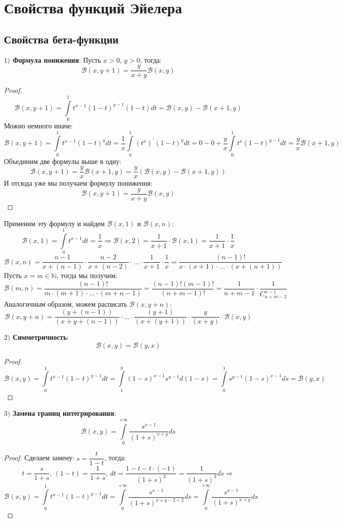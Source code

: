 \documentclass[12pt]{article}
\newcommand{\MN}{\mathbb{N}}
\newcommand{\MB}{\mathcal{B}}
\theoremstyle{definition}
\newcommand{\ddint}[2]{\displaystyle\int\limits_{#1}^{#2}}
\begin{document}
\newpage
\section*{Свойства функций Эйелера}
\subsection*{Свойства бета-функции}

\textbf{$1)$ Формула понижения}: Пусть $x > 0, \, y > 0$, тогда:
$$
	\MB(x, y+1) = \dfrac{y}{x + y}\MB(x,y)
$$
\begin{proof}
	$$
		\MB(x,y+1) = \ddint{0}{1}t^{x-1}(1-t)^{y-1}(1-t)dt= \MB(x,y) - \MB(x+1,y)
	$$
	Можно немного иначе:
	$$
		\MB(x,y+1) = \ddint{0}{1}t^{x-1}(1-t)^{y}dt = \dfrac{1}{x}\ddint{0}{1}\left(t^x\right)^\prime(1-t)^{y}dt = 0 - 0 + \dfrac{y}{x}\ddint{0}{1}t^x(1-t)^{y-1}dt = \dfrac{y}{x}\MB(x+1,y)
	$$
	Объединим две формулы выше в одну:
	$$
		\MB(x, y+1) = \dfrac{y}{x}\MB(x + 1, y) = \dfrac{y}{x}\left(\MB(x,y) - \MB(x + 1, y)\right)
	$$
	И отсюда уже мы получаем формулу понижения:
	$$
		\MB(x, y+1) = \dfrac{y}{x + y}\MB(x,y)
	$$
\end{proof}
Применим эту формулу и найдем $\MB(x,1)$ и $\MB(x,n)$:
$$
	\MB(x,1) = \ddint{0}{1}t^{x-1}dt = \dfrac{1}{x} \Rightarrow \MB(x,2) = \dfrac{1}{x+1}{\cdot}\MB(x,1) = \dfrac{1}{x+1}{\cdot}\dfrac{1}{x}
$$
$$
	\MB(x,n) = \dfrac{n-1}{x + (n-1)}{\cdot}\dfrac{n - 2}{x + (n-2)}{\cdot}\dotsc{\cdot}\dfrac{1}{x+1}{\cdot}\dfrac{1}{x} = \dfrac{(n-1)!}{x{\cdot}(x+1){\cdot}\dotsc{\cdot}(x + (n+1))}
$$
Пусть $x = m \in \MN$, тогда мы получим:
$$
	\MB(m,n) = \dfrac{(n-1)!}{m{\cdot}(m+1){\cdot} \dotsc {\cdot}(m + n -1)} = \dfrac{(n-1)!(m-1)!}{(n + m -1)!}= \dfrac{1}{n + m - 1}{\cdot}\dfrac{1}{C_{n + m - 2}^{n - 1}}
$$
Аналогичным образом, можем расписать $\MB(x,y + n)$:
$$
	\MB(x, y + n) = \dfrac{(y + (n - 1))}{(x + y + (n-1))}{\cdot}\dotsc{\cdot}\dfrac{(y+1)}{(x + (y+1))}{\cdot}\dfrac{y}
	{(x+y)}{\cdot}\MB(x,y)
$$

\textbf{$2)$ Симметричность}: 
$$
	\MB(x,y) = \MB(y,x)
$$
\begin{proof}
	$$
		\MB(x,y) = \ddint{0}{1}t^{x-1}(1 - t)^{y - 1}dt = \ddint{1}{0}(1-s)^{x-1}s^{y-1}d(1-s) = \ddint{0}{1}s^{y-1}(1-s)^{x-1}ds = \MB(y,x)
	$$
\end{proof}
\newpage
\textbf{$3)$ Замена границ интегрирования}: 
$$
	\MB(x,y) =  \ddint{0}{+\infty}\dfrac{s^{x-1}}{(1 + s)^{x+y}}ds
$$
\begin{proof}
	Сделаем замену: $s = \dfrac{t}{1-t}$, тогда:
	$$
		t = \dfrac{s}{1 + s}, \, (1 - t) = \dfrac{1}{1+s}, \, dt = \dfrac{1 - t - t{\cdot}(-1)}{(1 + s)^2} = \dfrac{1}{(1+s)^2}ds \Rightarrow
	$$
	$$
		\MB(x,y) = \ddint{0}{1}t^{x-1}(1 - t)^{y - 1}dt = \ddint{0}{+\infty}\dfrac{s^{x-1}}{(1 + s)^{x+y - 2 + 2}}ds = \ddint{0}{+\infty}\dfrac{s^{x-1}}{(1 + s)^{x+y}}ds
	$$
\end{proof}
\end{document}
